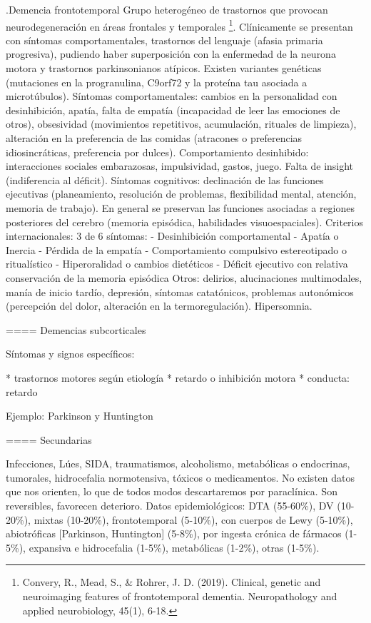 \documentclass{scrbook}
\begin{document}
.Demencia frontotemporal
Grupo heterogéneo de trastornos que provocan neurodegeneración en áreas frontales y temporales \footnote{Convery, R., Mead, S., \& Rohrer, J. D. (2019). Clinical, genetic and neuroimaging features of frontotemporal dementia. Neuropathology and applied neurobiology, 45(1), 6-18.}. Clínicamente se presentan con síntomas comportamentales, trastornos del lenguaje (afasia primaria progresiva), pudiendo haber superposición con la enfermedad de la neurona motora y trastornos parkinsonianos atípicos. Existen variantes genéticas (mutaciones en la progranulina, C9orf72 y la proteína tau asociada a microtúbulos).
Síntomas comportamentales: cambios en la personalidad con desinhibición, apatía, falta de empatía (incapacidad de leer las emociones de otros), obsesividad (movimientos repetitivos, acumulación, rituales de limpieza), alteración en la preferencia de las comidas (atracones o preferencias idiosincráticas, preferencia por dulces). Comportamiento desinhibido: interacciones sociales embarazosas, impulsividad, gastos, juego. Falta de insight (indiferencia al déficit).
Síntomas cognitivos: declinación de las funciones ejecutivas (planeamiento, resolución de problemas, flexibilidad mental, atención, memoria de trabajo). En general se preservan las funciones asociadas a regiones posteriores del cerebro (memoria episódica, habilidades visuoespaciales).
Criterios internacionales: 3 de 6 síntomas:
- Desinhibición comportamental
- Apatía o Inercia
- Pérdida de la empatía
- Comportamiento compulsivo estereotipado o ritualístico
- Hiperoralidad o cambios dietéticos
- Déficit ejecutivo con relativa conservación de la memoria episódica
Otros: delirios, alucinaciones multimodales, manía de inicio tardío, depresión, síntomas catatónicos, problemas autonómicos (percepción del dolor, alteración en la termoregulación). Hipersomnia.

==== Demencias subcorticales

Síntomas y signos específicos:

* trastornos motores según etiología
* retardo o inhibición motora
* conducta: retardo

Ejemplo: Parkinson y Huntington

==== Secundarias

Infecciones, Lúes, SIDA, traumatismos, alcoholismo, metabólicas o endocrinas, tumorales, hidrocefalia normotensiva, tóxicos o medicamentos. No existen datos que nos orienten, lo que de todos modos descartaremos por paraclínica. Son reversibles, favorecen deterioro. Datos epidemiológicos: DTA (55-60\%), DV (10-20\%), mixtas (10-20\%), frontotemporal (5-10\%), con cuerpos de Lewy (5-10\%), abiotróficas [Parkinson, Huntington] (5-8\%), por ingesta crónica de fármacos (1-5\%), expansiva e hidrocefalia (1-5\%), metabólicas (1-2\%), otras (1-5\%).
\end{document}

